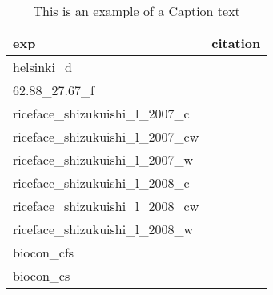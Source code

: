 \begin{table}[ht]
\centering
\begin{tabular}{ll}
  \hline
exp & citation \\ 
  \hline
helsinki\_d & \cite{aaltonen_et_al_2016}   \\
  62.88\_27.67\_f & \cite{aarnio_and_martikainen_1995}   \\
  riceface\_shizukuishi\_l\_2007\_c & \cite{adachi_et_al_2014}   \\
  riceface\_shizukuishi\_l\_2007\_cw & \cite{adachi_et_al_2014}   \\
  riceface\_shizukuishi\_l\_2007\_w & \cite{adachi_et_al_2014}   \\
  riceface\_shizukuishi\_l\_2008\_c & \cite{adachi_et_al_2014}   \\
  riceface\_shizukuishi\_l\_2008\_cw & \cite{adachi_et_al_2014}   \\
  riceface\_shizukuishi\_l\_2008\_w & \cite{adachi_et_al_2014}   \\
  biocon\_cfs & \cite{adair_et_al_2009}   \\
  biocon\_cs & \cite{adair_et_al_2009}   \\
  \end{tabular}
\caption{This is an example of a Caption text} 
\end{table}
